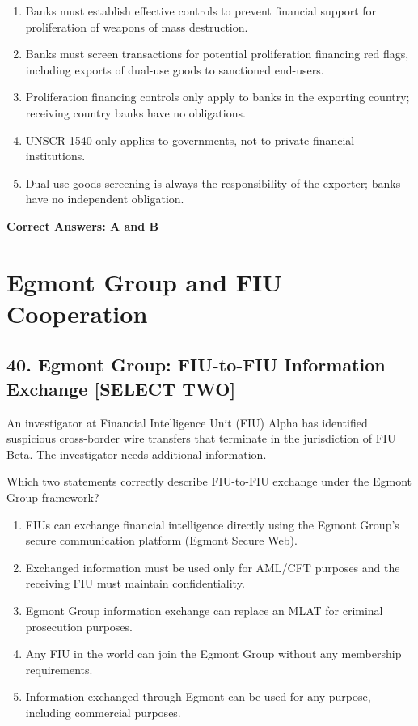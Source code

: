 \documentclass[11pt,a4paper]{article}
\begin{document}
	\begin{enumerate}[label=\Alph*.]
		\item Banks must establish effective controls to prevent financial support for proliferation of weapons of mass destruction.
		\item Banks must screen transactions for potential proliferation financing red flags, including exports of dual-use goods to sanctioned end-users.
		\item Proliferation financing controls only apply to banks in the exporting country; receiving country banks have no obligations.
		\item UNSCR 1540 only applies to governments, not to private financial institutions.
		\item Dual-use goods screening is always the responsibility of the exporter; banks have no independent obligation.
	\end{enumerate}
	
	\textbf{Correct Answers: A and B}
	
	\section{Egmont Group and FIU Cooperation}
	
	\subsection{40. Egmont Group: FIU-to-FIU Information Exchange \textnormal{[SELECT TWO]}}
	
	An investigator at Financial Intelligence Unit (FIU) Alpha has identified suspicious cross-border wire transfers that terminate in the jurisdiction of FIU Beta. The investigator needs additional information.
	
	Which two statements correctly describe FIU-to-FIU exchange under the Egmont Group framework?
	
	\begin{enumerate}[label=\Alph*.]
		\item FIUs can exchange financial intelligence directly using the Egmont Group's secure communication platform (Egmont Secure Web).
		\item Exchanged information must be used only for AML/CFT purposes and the receiving FIU must maintain confidentiality.
		\item Egmont Group information exchange can replace an MLAT for criminal prosecution purposes.
		\item Any FIU in the world can join the Egmont Group without any membership requirements.
		\item Information exchanged through Egmont can be used for any purpose, including commercial purposes.
	\end{enumerate}
	
\end{document}
